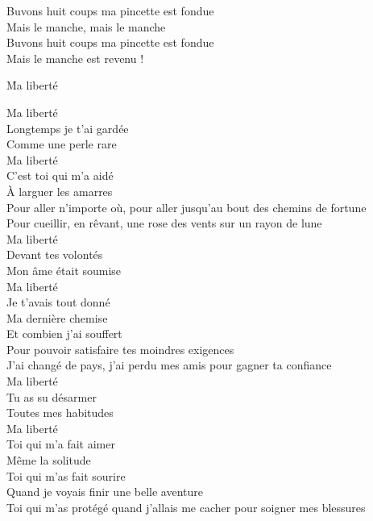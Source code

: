 \documentclass{novel}
\begin{document}
{\begin{minipage}[t][0.5\textheight][t]{\textwidth}
\begin{multicols}{2}
Buvons huit coups ma pincette est fondue \\
Mais le manche, mais le manche \\
Buvons huit coups ma pincette est fondue \\
Mais le manche est revenu !
\end{multicols}
\end{minipage}
\begin{minipage}[t][0.5\textheight][t]{\textwidth}
\vspace{0.00\textheight}
\h*{Ma liberté}
\begin{multicols}{2}
Ma liberté \\
Longtemps je t'ai gardée \\
Comme une perle rare \\
Ma liberté \\
C'est toi qui m'a aidé \\
À larguer les amarres \\
Pour aller n'importe où, pour aller jusqu'au bout des chemins de fortune \\
Pour cueillir, en rêvant, une rose des vents sur un rayon de lune \\

Ma liberté \\
Devant tes volontés \\
Mon âme était soumise \\
Ma liberté \\
Je t'avais tout donné \\
Ma dernière chemise \\
Et combien j'ai souffert \\
Pour pouvoir satisfaire tes moindres exigences \\
J'ai changé de pays, j'ai perdu mes amis pour gagner ta confiance \\

Ma liberté \\
Tu as su désarmer \\
Toutes mes habitudes \\
Ma liberté \\
Toi qui m'a fait aimer \\
Même la solitude \\
Toi qui m'as fait sourire \\
Quand je voyais finir une belle aventure \\
Toi qui m'as protégé quand j'allais me cacher pour soigner mes blessures \\


\end{multicols}
\end{minipage}}
\end{document}
